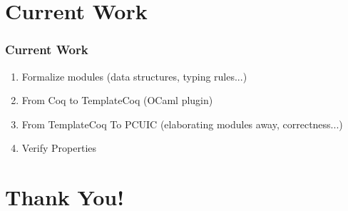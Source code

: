 \section{Current Work}
\begin{frame}
    \frametitle{Current Work}
    \begin{enumerate}
    \item Formalize modules (data structures, typing rules...)
    \item From Coq to TemplateCoq (OCaml plugin)
    \item From TemplateCoq To PCUIC (elaborating modules away, correctness...)
    \item Verify Properties
    \end{enumerate}

\end{frame}

\section{Thank You!}